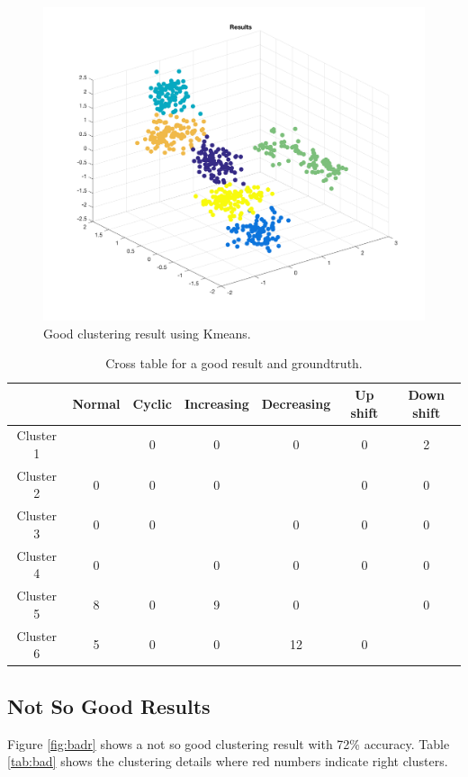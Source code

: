 \documentclass[a4paper]{article}
\begin{document}
\begin{figure}[htbp]
\centering
\includegraphics[width=1\textwidth]{goodr.png}
\caption{\label{fig:goodr}Good clustering result using Kmeans.}
\end{figure}

\begin{table}[htbp]
\caption{\label{tab:good}Cross table for a good result and groundtruth.}
\centering
\begin{tabular}{|c|c|c|c|c|c|c|}
 \hline
  & Normal & Cyclic & Increasing& Decreasing & Up shift &Down shift\\
 \hline
Cluster 1 & {\color{red}{87}} & 0 & 0 & 0 & 0 & 2 \\
 \hline
Cluster 2 & 0 & 0 & 0 & {\color{red}{88}} & 0 & 0\\
 \hline
Cluster 3 & 0 & 0 & {\color{red}{91}} & 0 & 0 & 0 \\
 \hline
Cluster 4 & 0 & {\color{red}{100}} & 0 & 0 & 0 & 0\\
 \hline
 Cluster 5 & 8 & 0 & 9 & 0 & {\color{red}{100}} & 0\\
 \hline
 Cluster 6 & 5 & 0 & 0 & 12 & 0 & {\color{red}{98}}\\
 \hline
\end{tabular}
\end{table}

\subsection{Not So Good Results}\label{sec:bad}
Figure \ref{fig:badr} shows a not so good clustering result with 72\% accuracy. Table \ref{tab:bad} shows the clustering details where red numbers indicate right clusters.
\end{document}
